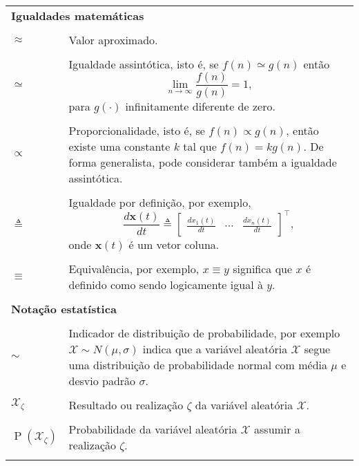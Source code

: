 \begin{longtable}{p{1in}p{4.5in}}
\multicolumn{2}{l}{\bf Igualdades matemáticas}
\index{igualdades}
\tabularnewline
\tabularnewline

$\approx$ \dotfill &
\index{$\approx$}%
Valor aproximado.
\tabularnewline
\tabularnewline

$\simeq$ \dotfill &
\index{$\simeq$}%
Igualdade assintótica, isto é, se $f(n) \simeq g(n)$ então
\begin{equation*}
\lim_{n\rightarrow\infty}\frac{f(n)}{g(n)}=1\text{,}
\end{equation*}
para $g(\cdot)$ infinitamente diferente de zero.
\tabularnewline
\tabularnewline

$\propto$ \dotfill &
\index{$\propto$}%
Proporcionalidade, isto é, se $f(n) \propto g(n)$, então existe uma constante
$k$ tal que $f(n)=kg(n)$.
De forma generalista, pode considerar também a igualdade assintótica.
\tabularnewline
\tabularnewline

$\triangleq$ \dotfill &
\index{$\triangleq$}%
Igualdade por definição, por exemplo,
\begin{equation*}
\frac{d\mathbf{x}(t)}{dt}
\triangleq
\begin{bmatrix}
\frac{dx_1(t)}{dt} & \dotsb & \frac{dx_n(t)}{dt}
\end{bmatrix}^\intercal\text{,}
\end{equation*}
onde $\mathbf{x}(t)$ é um vetor coluna.
\tabularnewline
\tabularnewline

$\equiv$ \dotfill &
\index{$\equiv$}%
Equivalência, por exemplo, $x \equiv y$ significa que $x$ é definido como
sendo logicamente igual à $y$.
\tabularnewline
\tabularnewline

\multicolumn{2}{l}{\bf Notação estatística}
\tabularnewline
\tabularnewline

$\sim$ \dotfill &
Indicador de distribuição de probabilidade, por exemplo $\mathcal{X} \sim
N(\mu,\sigma)$ indica que a variável aleatória $\mathcal{X}$ segue uma
distribuição de probabilidade normal com média $\mu$ e desvio padrão
$\sigma$.
\index{media@média}%
\index{desvio padrao@desvio padrão}%
\tabularnewline
\tabularnewline

$\mathcal{X}_\zeta$ \dotfill &
\index{variavel aleatoria@variável aleatória!realizacao@realização}%
Resultado ou realização $\zeta$ da variável aleatória $\mathcal{X}$.
\tabularnewline
\tabularnewline

$\operatorname{P}(\mathcal{X}_\zeta)$ \dotfill &
\index{probabilidade}%
\index{$\operatorname{P}(\mathcal{X}_\zeta)$}%
Probabilidade da variável aleatória $\mathcal{X}$ assumir a realização
$\zeta$.
\tabularnewline
\tabularnewline


\end{longtable}

